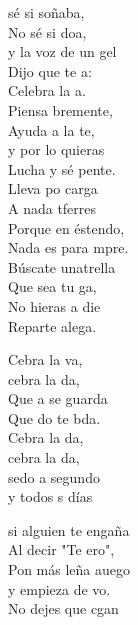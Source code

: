 \documentclass[12pt]{article}
\begin{document}
\begin{multicols*}{2}
\begin{cancion}%
	 sé si soñaba,\\
	No sé si doa, \\
	y la voz de un gel\\
	Dijo que te a:\\
	Celebra la a.   \\
	Piensa bremente,\\
	Ayuda a la te,\\
	y por lo  quieras\\
	Lucha y sé pente.\\
	Lleva po carga\\
	A nada tferres\\
	Porque en éstendo,\\
	Nada es para mpre.\\
	Búscate unatrella\\
	Que sea tu ga, \\
	No hieras a die\\
	Reparte alega.\\
	\begin{chorus}%
	Cebra la va, \\
	cebra la da,\\
	Que a se guarda\\
	Que do te bda.\\
	Cebra la da, \\
	cebra la da,\\
	sedo a segundo\\
	y todos s días\\
	\end{chorus}%
	si alguien te engaña\\
	Al decir "Te ero",\\
	Pon más leña auego\\
	y empieza de vo.\\
	No dejes que cgan\\

\end{cancion}
\end{multicols*}
\end{document}
